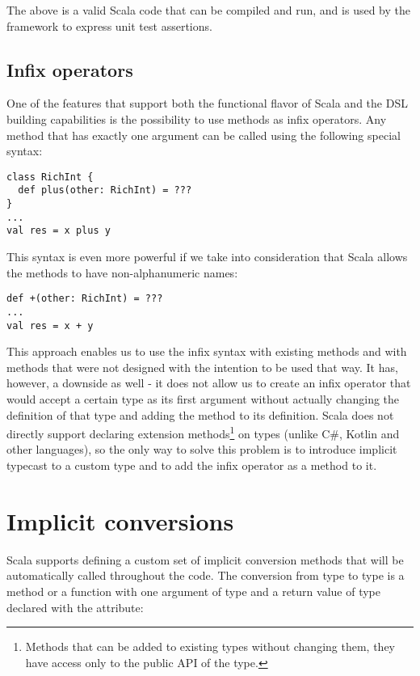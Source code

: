 The above is a valid Scala code that can be compiled and run, and is used by the framework to express unit test assertions.

\subsection{Infix operators}
\label{subsec:infixops}

One of the features that support both the functional flavor of Scala and the DSL building capabilities is the possibility to use methods as infix operators. Any method that has exactly one argument can be called using the following special syntax:

\lstset{style=Scala}
\begin{lstlisting}
class RichInt {
  def plus(other: RichInt) = ???
}
...
val res = x plus y
\end{lstlisting}

This syntax is even more powerful if we take into consideration that Scala allows the methods to have non-alphanumeric names:

\lstset{style=Scala}
\begin{lstlisting}
def +(other: RichInt) = ???
...
val res = x + y
\end{lstlisting}

This approach enables us to use the infix syntax with existing methods and with methods that were not designed with the intention to be used that way. It has, however, a downside as well - it does not allow us to create an infix operator that would accept a certain type as its first argument without actually changing the definition of that type and adding the method to its definition. Scala does not directly support declaring extension methods\footnote{Methods that can be added to existing types without changing them, they have access only to the public API of the type.} on types (unlike C\#, Kotlin and other languages), so the only way to solve this problem is to introduce implicit typecast to a custom type and to add the infix operator as a method to it.

\section{Implicit conversions}
\label{sec:implicits}

Scala supports defining a custom set of implicit conversion methods that will be automatically called throughout the code. The conversion from type  to type  is a method or a function with one argument of type  and a return value of type  declared with the  attribute:

